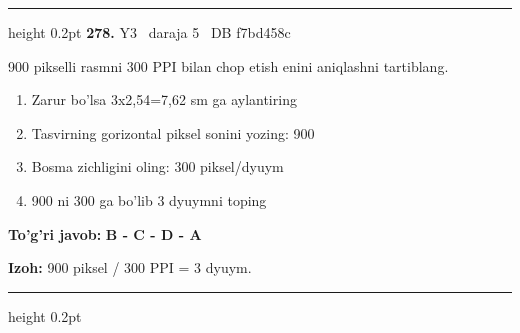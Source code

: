 \documentclass[10pt,a4paper,oneside]{article}
\begin{document}
\vspace{2mm}\hrule height 0.2pt \vspace{4mm}
\hypertarget{q278}{\textbf{\color{ink}278.}}  {\color{muted}\scriptsize Y3 \textbullet\ daraja 5 \textbullet\ DB f7bd458c}
\par
900 pikselli rasmni 300 PPI bilan chop etish enini aniqlashni tartiblang.
\begin{enumerate}[label=\Alph*),leftmargin=9mm]
\item Zarur bo'lsa 3x2,54=7,62 sm ga aylantiring
\item Tasvirning gorizontal piksel sonini yozing: 900
\item Bosma zichligini oling: 300 piksel/dyuym
\item 900 ni 300 ga bo'lib 3 dyuymni toping
\end{enumerate}
\begin{tcolorbox}[enhanced,breakable,colback=teal!4,colframe=teal!45!black,boxrule=0.45pt,arc=1.2mm,left=2.8mm,right=2.8mm,top=2mm,bottom=2mm,before skip=2mm,after skip=2mm]
\textbf{\color{teal}To'g'ri javob:} \textbf{B - C - D - A}
\par\smallskip
\textbf{Izoh:} 900 piksel / 300 PPI = 3 dyuym.
\end{tcolorbox}
\vspace{2mm}\hrule height 0.2pt \vspace{4mm}
\end{document}
